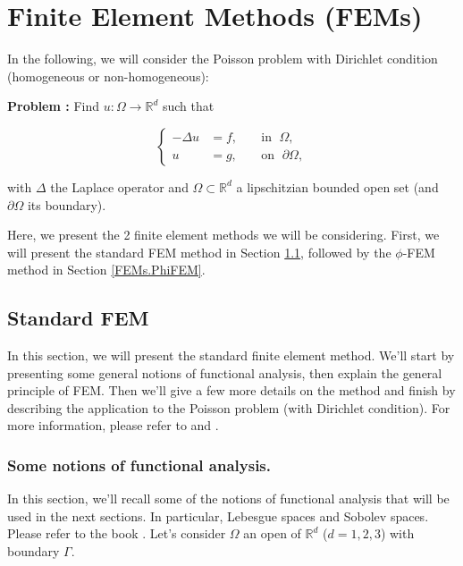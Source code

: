 \section{Finite Element Methods (FEMs)} \label{FEMs}
\graphicspath{{images/FEM}}

In the following, we will consider the Poisson problem with Dirichlet condition (homogeneous or non-homogeneous):

\textbf{Problem :} Find $u : \Omega \rightarrow \mathbb{R}^d$ such that

\begin{equation*}
	\left\{
		\begin{aligned}
			-\Delta u &= f, \; &&\text{in } \; \Omega, \\
			u&=g, \; &&\text{on } \; \partial\Omega,
		\end{aligned}
	\right.
\end{equation*}

with $\Delta$ the Laplace operator and $\Omega\subset\mathbb{R}^d$ a lipschitzian bounded open set (and $\partial\Omega$ its boundary).

Here, we present the 2 finite element methods we will be considering. First, we will present the standard FEM method in Section \ref{FEMs.FEM}, followed by the $\phi$-FEM method in Section \ref{FEMs.PhiFEM}.

\subsection{Standard FEM} \label{FEMs.FEM}

In this section, we will present the standard finite element method. We'll start by presenting some general notions of functional analysis, then explain the general principle of FEM. Then we'll give a few more details on the method and finish by describing the application to the Poisson problem (with Dirichlet condition). For more information, please refer to \cite{quarteroni_methodes_2007} and \cite{noauthor_methodes_nodate}.

\subsubsection{Some notions of functional analysis.}

In this section, we'll recall some of the notions of functional analysis that will be used in the next sections. In particular, Lebesgue spaces and Sobolev spaces. Please refer to the book \cite{brezis_functional_2011}. Let's consider $\Omega$ an open of $\mathbb{R}^d$ ($d=1,2,3$) with boundary $\Gamma$.

